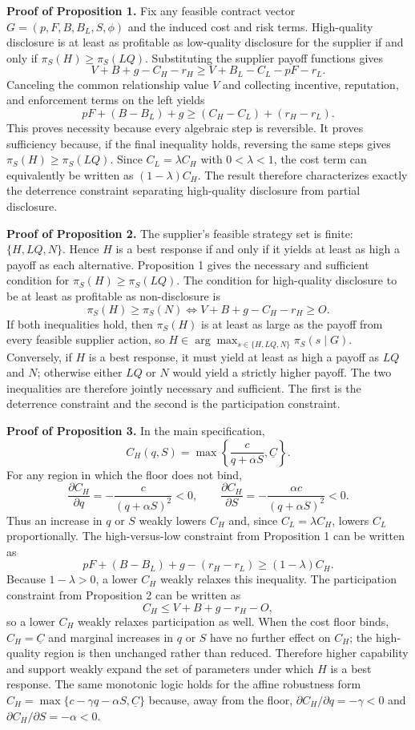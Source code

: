 \documentclass[final,5p,times,authoryear]{elsarticle}
\begin{document}
\textbf{Proof of Proposition 1.} Fix any feasible contract vector $G=(p,F,B,B_L,S,\phi)$ and the induced cost and risk terms. High-quality disclosure is at least as profitable as low-quality disclosure for the supplier if and only if $\pi_S(H)\geq \pi_S(LQ)$. Substituting the supplier payoff functions gives
\[
V+B+g-C_H-r_H \geq V+B_L-C_L-pF-r_L .
\]
Canceling the common relationship value $V$ and collecting incentive, reputation, and enforcement terms on the left yields
\[
pF+(B-B_L)+g \geq (C_H-C_L)+(r_H-r_L).
\]
This proves necessity because every algebraic step is reversible. It proves sufficiency because, if the final inequality holds, reversing the same steps gives $\pi_S(H)\geq\pi_S(LQ)$. Since $C_L=\lambda C_H$ with $0<\lambda<1$, the cost term can equivalently be written as $(1-\lambda)C_H$. The result therefore characterizes exactly the deterrence constraint separating high-quality disclosure from partial disclosure.

\textbf{Proof of Proposition 2.} The supplier's feasible strategy set is finite: $\{H,LQ,N\}$. Hence $H$ is a best response if and only if it yields at least as high a payoff as each alternative. Proposition 1 gives the necessary and sufficient condition for $\pi_S(H)\geq\pi_S(LQ)$. The condition for high-quality disclosure to be at least as profitable as non-disclosure is
\[
\pi_S(H)\geq\pi_S(N)
\iff
V+B+g-C_H-r_H\geq O .
\]
If both inequalities hold, then $\pi_S(H)$ is at least as large as the payoff from every feasible supplier action, so $H\in\arg\max_{s\in\{H,LQ,N\}}\pi_S(s\mid G)$. Conversely, if $H$ is a best response, it must yield at least as high a payoff as $LQ$ and $N$; otherwise either $LQ$ or $N$ would yield a strictly higher payoff. The two inequalities are therefore jointly necessary and sufficient. The first is the deterrence constraint and the second is the participation constraint.

\textbf{Proof of Proposition 3.} In the main specification,
\[
C_H(q,S)=\max\left\{\frac{c}{q+\alpha S},\underline{C}\right\}.
\]
For any region in which the floor does not bind,
\[
\frac{\partial C_H}{\partial q}=-\frac{c}{(q+\alpha S)^2}<0,\qquad
\frac{\partial C_H}{\partial S}=-\frac{\alpha c}{(q+\alpha S)^2}<0 .
\]
Thus an increase in $q$ or $S$ weakly lowers $C_H$ and, since $C_L=\lambda C_H$, lowers $C_L$ proportionally. The high-versus-low constraint from Proposition 1 can be written as
\[
pF+(B-B_L)+g-(r_H-r_L)\geq (1-\lambda)C_H .
\]
Because $1-\lambda>0$, a lower $C_H$ weakly relaxes this inequality. The participation constraint from Proposition 2 can be written as
\[
C_H \leq V+B+g-r_H-O,
\]
so a lower $C_H$ weakly relaxes participation as well. When the cost floor binds, $C_H=\underline{C}$ and marginal increases in $q$ or $S$ have no further effect on $C_H$; the high-quality region is then unchanged rather than reduced. Therefore higher capability and support weakly expand the set of parameters under which $H$ is a best response. The same monotonic logic holds for the affine robustness form $C_H=\max\{c-\gamma q-\alpha S,\underline{C}\}$ because, away from the floor, $\partial C_H/\partial q=-\gamma<0$ and $\partial C_H/\partial S=-\alpha<0$.
\end{document}
